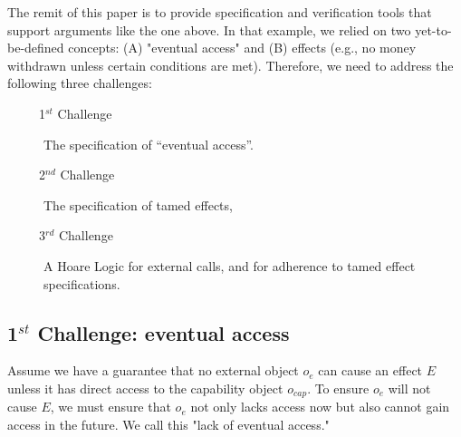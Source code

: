 \noindent
The remit of this paper is to provide specification and verification tools that support arguments like the one above. In that example, we relied on two yet-to-be-defined concepts: (A) "eventual access" and (B) \tamed effects (e.g., no money withdrawn unless certain conditions are met).
Therefore, we need to address the following three challenges: 
\begin{description}
\item[\ \ \ \ \  1$^{st}$ Challenge] The specification   of ``eventual  access''. 

\item[\ \ \ \ \   2$^{nd}$ Challenge] The specification of tamed effects, 

\item[\ \ \ \ \  3$^{rd}$ Challenge] A  Hoare Logic for external calls, and for adherence to tamed effect specifications.
\end{description}
%
 
 
\subsection{1$^{st}$ Challenge: eventual access} 


Assume we have a guarantee that no external object $o_e$ can cause an effect $E$ unless it has direct access to the capability object $o_{cap}$. To ensure $o_e$ will not cause $E$, we must ensure that $o_e$ not only lacks access now but also cannot gain access in the future.  We call this  "lack of eventual access."

